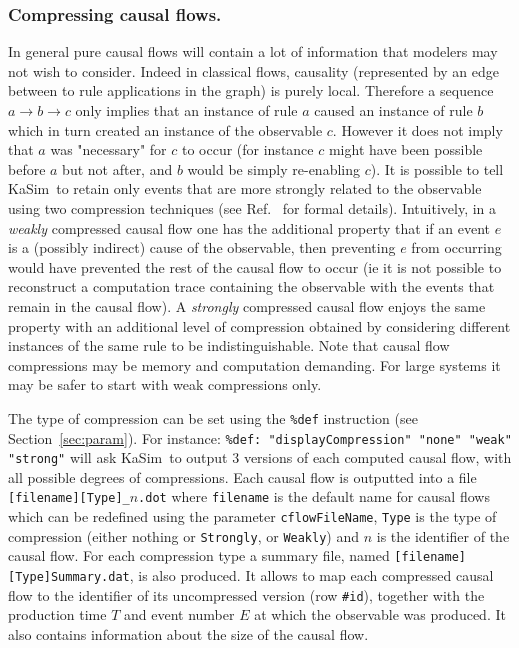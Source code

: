 \documentclass[11pt]{book}
\def\KaSim{\textsf{KaSim}}
\def\rar{\rightarrow}
\def\ie{ie }
\begin{document}
\subsubsection*{Compressing causal flows.}

In general pure causal flows will contain a lot of information that modelers may not wish to consider. Indeed in classical flows, causality (represented by an edge between to rule applications in the graph) is purely local. Therefore a sequence $a\rar b \rar c$ only implies that an instance of rule $a$ caused an instance of rule $b$ which in turn created an instance of the observable $c$. However it does not imply that $a$ was "necessary" for $c$ to occur (for instance $c$ might have been possible before $a$ but not after, and $b$ would be simply re-enabling $c$). It is possible to tell \KaSim~to retain only events that are more strongly related to the observable using two compression techniques (see Ref.~\cite{Dan_etal12} for formal details). Intuitively, in a \emph{weakly} compressed causal flow one has the additional property that if an event $e$ is a (possibly indirect) cause of the observable, then preventing $e$ from occurring would have prevented the rest of the causal flow to occur (\ie it is not possible to reconstruct a computation trace containing the observable with the events that remain in the causal flow). A \emph{strongly} compressed causal flow enjoys the same property with an additional level of compression obtained by considering different instances of the same rule to be indistinguishable. Note that causal flow compressions may be memory and computation demanding. For large systems it may be safer to start with weak compressions only. 

The type of compression can be set using the \texttt{\%def} instruction (see Section~\ref{sec:param}). For instance:
\lstinline[language=kappa]!%def: "displayCompression" "none" "weak" "strong"!
will ask \KaSim~to output 3 versions of each computed causal flow, with all possible degrees of compressions. Each causal flow is outputted into a file \texttt{[filename][Type]\_$n$.dot} where \texttt{filename} is the default name for causal flows which can be redefined using the parameter \texttt{cflowFileName}, \texttt{Type} is the type of compression (either nothing or \texttt{Strongly}, or \texttt{Weakly}) and $n$ is the identifier of the causal flow. For each compression type a summary file, named \texttt{[filename][Type]Summary.dat}, is also produced. It allows to map each compressed causal flow to the identifier of its uncompressed version (row \texttt{\#id}), together with the production time $T$ and event number $E$ at which the observable was produced. It also contains information about the size of the causal flow.
\end{document}
